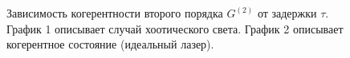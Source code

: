 \begin{figure}
\centering



\caption{Зависимость когерентности второго порядка $G^{(2)}$ от
  задержки $\tau$. График 1 описывает случай хоотического
  света. График 2 описывает когерентное состояние (идеальный лазер).}
\label{figPart4Ch2_4a}
\end{figure}
